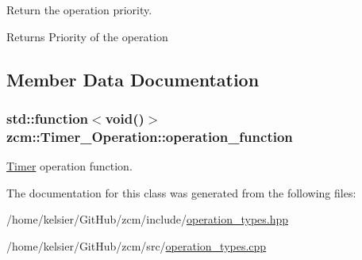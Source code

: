 Return the operation priority. 

\begin{DoxyReturn}{Returns}
Priority of the operation 
\end{DoxyReturn}


\subsection{Member Data Documentation}
\hypertarget{classzcm_1_1Timer__Operation_a492e0ec6be1dfa846bbc83d9e5dea9b0}{
\subsubsection[{operation\-\_\-function}]{\setlength{\rightskip}{0pt plus 5cm}std\-::function$<$void()$>$ zcm\-::\-Timer\-\_\-\-Operation\-::operation\-\_\-function\hspace{0.3cm}{\ttfamily [private]}}}\label{classzcm_1_1Timer__Operation_a492e0ec6be1dfa846bbc83d9e5dea9b0}


\hyperlink{classzcm_1_1Timer}{Timer} operation function. 



The documentation for this class was generated from the following files\-:\begin{DoxyCompactItemize}
\item 
/home/kelsier/\-Git\-Hub/zcm/include/\hyperlink{operation__types_8hpp}{operation\-\_\-types.\-hpp}\item 
/home/kelsier/\-Git\-Hub/zcm/src/\hyperlink{operation__types_8cpp}{operation\-\_\-types.\-cpp}\end{DoxyCompactItemize}

